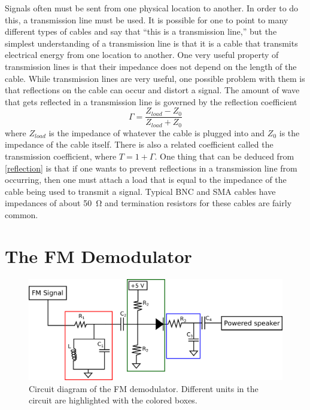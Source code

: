 \documentclass[11pt,letterpaper]{article}
\begin{document}
Signals often must be sent from one physical location to another. In order to do
this, a transmission line must be used. It is possible for one to point to many
different types of cables and say that ``this is a transmission line,'' but the
simplest understanding of a transmission line is that it is a cable that
transmits electrical energy from one location to another. One very useful
property of transmission lines is that their impedance does not depend on the
length of the cable. While transmission lines are very useful, one possible
problem with them is that reflections on the cable can occur and distort a
signal. The amount of wave that gets reflected in a transmission line is
governed by the reflection coefficient \cite{AstroBaki}
\begin{equation}
    \Gamma = \frac{Z_{load} - Z_0}{Z_{load} + Z_0}
    \label{reflection}
\end{equation}
where $Z_{load}$ is the impedance of whatever the cable is plugged into and
$Z_0$ is the impedance of the cable itself. There is also a related coefficient
called the transmission coefficient, where $T = 1 + \Gamma$. One thing that can
be deduced from \eqref{reflection} is that if one wants to prevent reflections
in a transmission line from occurring, then one must attach a load that is equal
to the impedance of the cable being used to transmit a signal. Typical BNC and
SMA cables have impedances of about \SI{50}{\ohm} and termination resistors for
these cables are fairly common.

\section{The FM Demodulator}

\begin{figure}
    \centering
    \includegraphics[width=\textwidth]{figures/demod.png}
    \caption{Circuit diagram of the FM demodulator. Different units in the
    circuit are highlighted with the colored boxes.}
    \label{demod}
\end{figure}
\end{document}
